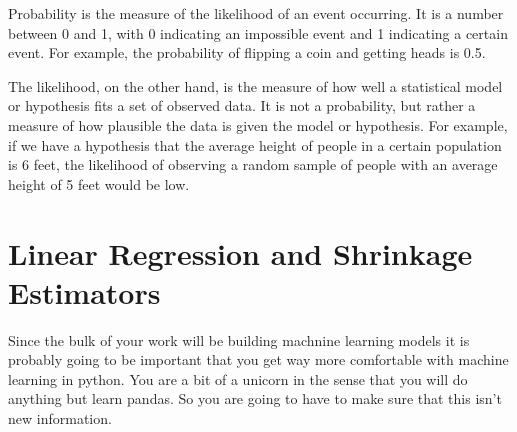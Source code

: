 \documentclass[
  letterpaper,
  DIV=11,
  numbers=noendperiod]{scrreprt}
\begin{document}
Probability is the measure of the likelihood of an event occurring. It
is a number between 0 and 1, with 0 indicating an impossible event and 1
indicating a certain event. For example, the probability of flipping a
coin and getting heads is 0.5.

The likelihood, on the other hand, is the measure of how well a
statistical model or hypothesis fits a set of observed data. It is not a
probability, but rather a measure of how plausible the data is given the
model or hypothesis. For example, if we have a hypothesis that the
average height of people in a certain population is 6 feet, the
likelihood of observing a random sample of people with an average height
of 5 feet would be low.


\chapter{Linear Regression and Shrinkage
Estimators}\label{linear-regression-and-shrinkage-estimators}

Since the bulk of your work will be building machnine learning models it
is probably going to be important that you get way more comfortable with
machine learning in python. You are a bit of a unicorn in the sense that
you will do anything but learn pandas. So you are going to have to make
sure that this isn't new information.
\end{document}
